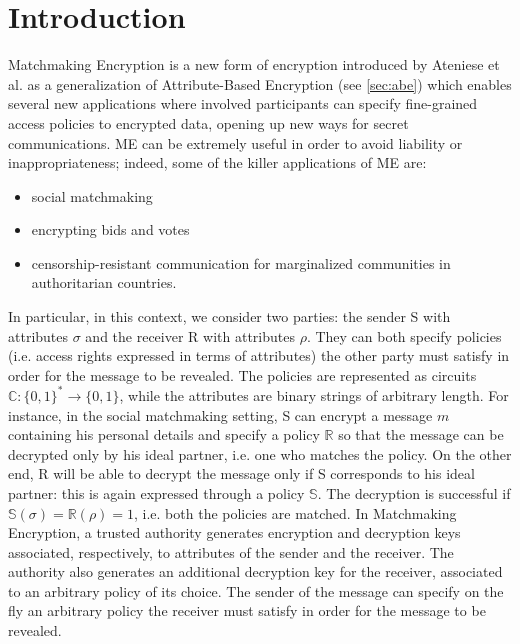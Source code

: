 \chapter{Introduction}
Matchmaking Encryption is a new form of encryption introduced by Ateniese et al. \cite{Ateniese} as a generalization of Attribute-Based Encryption (see \ref{sec:abe}) which enables several new applications where involved participants can specify fine-grained access policies to encrypted data, opening up new ways for secret communications.
\newline\newline
ME can be extremely useful in order to avoid liability or inappropriateness; indeed, some of the killer applications of ME are:
\begin{itemize}
    \item social matchmaking
    \item encrypting bids and votes
    \item censorship-resistant communication for marginalized communities in authoritarian countries.
\end{itemize}
In particular, in this context, we consider two parties: the sender S with attributes $\sigma$ and the receiver R with attributes $\rho$.
They can both specify policies (i.e. access rights expressed in terms of attributes) the other party must satisfy in order for the message to be revealed.
The policies are represented as circuits $\mathbb{C} : \{0, 1\}^* \to \{0, 1\}$, while the attributes are binary strings of arbitrary length.
For instance, in the social matchmaking setting, S can encrypt a message $m$ containing his personal details and specify a policy $\mathbb{R}$ so that the message can be decrypted only by his ideal partner, i.e. one who matches the policy.
On the other end, R will be able to decrypt the message only if S corresponds to his ideal partner: this is again expressed through a policy $\mathbb{S}$. The decryption is successful if $\mathbb{S}(\sigma) = \mathbb{R}(\rho) = 1$, i.e. both the policies are matched.
\newline\newline
In Matchmaking Encryption, a trusted authority generates encryption and decryption keys associated, respectively, to attributes of the sender and the receiver.
The authority also generates an additional decryption key for the receiver, associated to an arbitrary policy of its choice.
The sender of the message can specify on the fly an arbitrary policy the receiver must satisfy in order for the message to be revealed.
